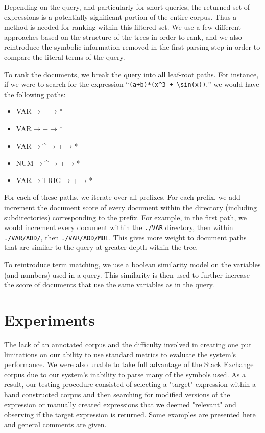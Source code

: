\documentclass{sig-alternate}
\begin{document}
Depending on the query, and particularly for short queries, the returned set of expressions is a potentially
significant portion of the entire corpus. Thus a method is needed for ranking within this filtered set. We 
use a few different approaches based on the structure of the trees in order to rank, and we also reintroduce
the symbolic information removed in the first parsing step in order to compare the literal terms of the query.

To rank the documents, we break the query into all leaf-root paths.  For instance, if we were to search for the expression ``\texttt{(a+b)*(x\^{}3 + \textbackslash sin(x))},'' we would have the following paths:
\begin{itemize}
\item VAR$\rightarrow$+$\rightarrow$*
\item VAR$\rightarrow$+$\rightarrow$*
\item VAR$\rightarrow$\textasciicircum$\rightarrow$+$\rightarrow$*
\item NUM$\rightarrow$\textasciicircum$\rightarrow$+$\rightarrow$*
\item VAR$\rightarrow$TRIG$\rightarrow$+$\rightarrow$*
\end{itemize}

For each of these paths, we iterate over all prefixes.  For each prefix, we add increment the document score of every document within the directory (including subdirectories) corresponding to the prefix.  For example, in the first path, we would increment every document within the \texttt{./VAR} directory, then within \texttt{./VAR/ADD/}, then \texttt{./VAR/ADD/MUL}.  This gives more weight to document paths that are similar to the query at greater depth within the tree.

To reintroduce term matching, we use a boolean similarity  model on the variables (and numbers) used in a query.  This similarity is then used to further increase the score of documents that use the same variables as in the query.


\section{Experiments}
The lack of an annotated corpus and the difficulty involved in creating one put limitations on our ability
to use standard metrics to evaluate the system's performance. We were also unable to take full advantage of the 
Stack Exchange corpus due to our system's inability to parse many of the symbols used. As a result, our testing procedure consisted of selecting a "target" expression within a hand constructed corpus and then searching for modified versions of the expression or manually created expressions that we deemed "relevant" and observing if the target expression is returned. Some examples are presented here and general comments are given. 
\end{document}
